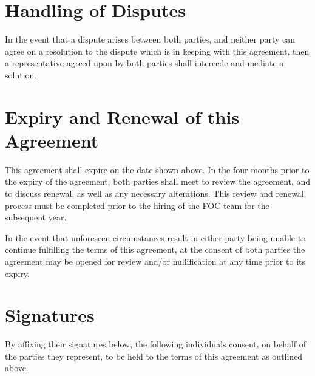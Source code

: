 \documentclass[12pt, letterpaper]{mathsoc}
\begin{document}
\section{Handling of Disputes}

In the event that a dispute arises between both parties, and neither party can agree on a resolution to the dispute which is in keeping with this agreement, then a representative agreed upon by both parties shall intercede and mediate a solution.

\section{Expiry and Renewal of this Agreement}

This agreement shall expire on the date shown above. In the four months prior to the expiry of the agreement, both parties shall meet to review the agreement, and to discuss renewal, as well as any necessary alterations. This review and renewal process must be completed prior to the hiring of the FOC team for the subsequent year.

In the event that unforeseen circumstances result in either party being unable to continue fulfilling the terms of this agreement, at the consent of both parties the agreement may be opened for review and/or nullification at any time prior to its expiry.

\newpage
\section{Signatures}

By affixing their signatures below, the following individuals consent, on behalf of the parties they represent, to be held to the terms of this agreement as outlined above.




\end{document}
